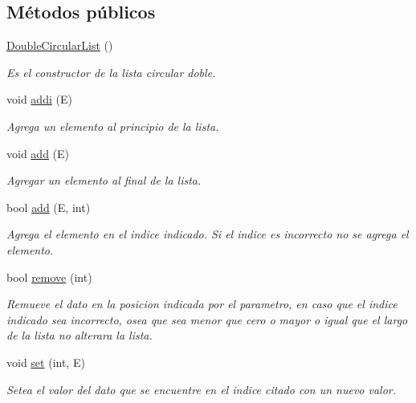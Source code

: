 \subsection*{Métodos públicos}
\begin{DoxyCompactItemize}
\item 
\hypertarget{classDoubleCircularList_a533876254e3c837d556542eda9968f8b}{\hyperlink{classDoubleCircularList_a533876254e3c837d556542eda9968f8b}{Double\-Circular\-List} ()}\label{classDoubleCircularList_a533876254e3c837d556542eda9968f8b}

\begin{DoxyCompactList}\small\item\em Es el constructor de la lista circular doble. \end{DoxyCompactList}\item 
void \hyperlink{classDoubleCircularList_ade2ef68a86a8deef4cb43d38e031906b}{addi} (E)
\begin{DoxyCompactList}\small\item\em Agrega un elemento al principio de la lista. \end{DoxyCompactList}\item 
void \hyperlink{classDoubleCircularList_a7691d38e77ea44d222c465f27e7d05b6}{add} (E)
\begin{DoxyCompactList}\small\item\em Agregar un elemento al final de la lista. \end{DoxyCompactList}\item 
bool \hyperlink{classDoubleCircularList_a6d76f7045dd9997f55c6c2feb80678da}{add} (E, int)
\begin{DoxyCompactList}\small\item\em Agrega el elemento en el indice indicado. Si el indice es incorrecto no se agrega el elemento. \end{DoxyCompactList}\item 
bool \hyperlink{classDoubleCircularList_ae7ed8b6714720cb7daafa639f232ecc3}{remove} (int)
\begin{DoxyCompactList}\small\item\em Remueve el dato en la posicion indicada por el parametro, en caso que el indice indicado sea incorrecto, osea que sea menor que cero o mayor o igual que el largo de la lista no alterara la lista. \end{DoxyCompactList}\item 
void \hyperlink{classDoubleCircularList_a95e0f27bda1158233015ee3ff27b3ade}{set} (int, E)
\begin{DoxyCompactList}\small\item\em Setea el valor del dato que se encuentre en el indice citado con un nuevo valor. \end{DoxyCompactList}\item 

\end{DoxyCompactItemize}
